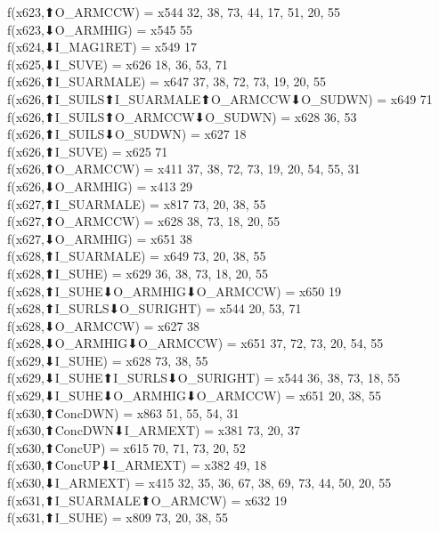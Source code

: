 f(x623,⬆O_ARMCCW) = x544 {32, 38, 73, 44, 17, 51, 20, 55} \\
f(x623,⬇O_ARMHIG) = x545 {55} \\
f(x624,⬇I_MAG1RET) = x549 {17} \\
f(x625,⬇I_SUVE) = x626 {18, 36, 53, 71} \\
f(x626,⬆I_SUARMALE) = x647 {37, 38, 72, 73, 19, 20, 55} \\
f(x626,⬆I_SUILS⬆I_SUARMALE⬆O_ARMCCW⬇O_SUDWN) = x649 {71} \\
f(x626,⬆I_SUILS⬆O_ARMCCW⬇O_SUDWN) = x628 {36, 53} \\
f(x626,⬆I_SUILS⬇O_SUDWN) = x627 {18} \\
f(x626,⬆I_SUVE) = x625 {71} \\
f(x626,⬆O_ARMCCW) = x411 {37, 38, 72, 73, 19, 20, 54, 55, 31} \\
f(x626,⬇O_ARMHIG) = x413 {29} \\
f(x627,⬆I_SUARMALE) = x817 {73, 20, 38, 55} \\
f(x627,⬆O_ARMCCW) = x628 {38, 73, 18, 20, 55} \\
f(x627,⬇O_ARMHIG) = x651 {38} \\
f(x628,⬆I_SUARMALE) = x649 {73, 20, 38, 55} \\
f(x628,⬆I_SUHE) = x629 {36, 38, 73, 18, 20, 55} \\
f(x628,⬆I_SUHE⬇O_ARMHIG⬇O_ARMCCW) = x650 {19} \\
f(x628,⬆I_SURLS⬇O_SURIGHT) = x544 {20, 53, 71} \\
f(x628,⬇O_ARMCCW) = x627 {38} \\
f(x628,⬇O_ARMHIG⬇O_ARMCCW) = x651 {37, 72, 73, 20, 54, 55} \\
f(x629,⬇I_SUHE) = x628 {73, 38, 55} \\
f(x629,⬇I_SUHE⬆I_SURLS⬇O_SURIGHT) = x544 {36, 38, 73, 18, 55} \\
f(x629,⬇I_SUHE⬇O_ARMHIG⬇O_ARMCCW) = x651 {20, 38, 55} \\
f(x630,⬆ConcDWN) = x863 {51, 55, 54, 31} \\
f(x630,⬆ConcDWN⬇I_ARMEXT) = x381 {73, 20, 37} \\
f(x630,⬆ConcUP) = x615 {70, 71, 73, 20, 52} \\
f(x630,⬆ConcUP⬇I_ARMEXT) = x382 {49, 18} \\
f(x630,⬇I_ARMEXT) = x415 {32, 35, 36, 67, 38, 69, 73, 44, 50, 20, 55} \\
f(x631,⬆I_SUARMALE⬆O_ARMCW) = x632 {19} \\
f(x631,⬆I_SUHE) = x809 {73, 20, 38, 55} \\
